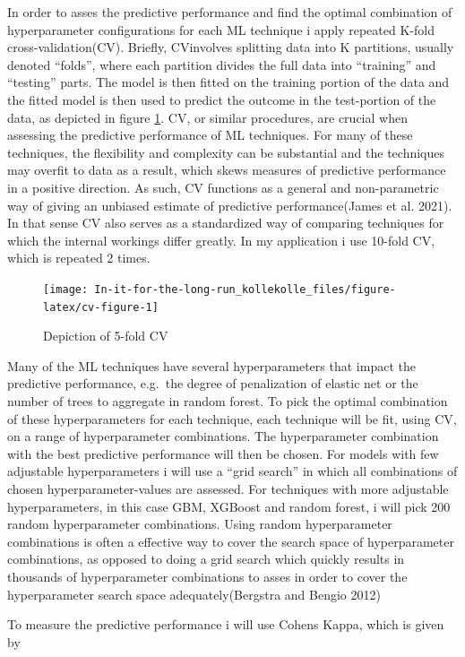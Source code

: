 \documentclass[
]{article}
\begin{document}
In order to asses the predictive performance and find the optimal combination of hyperparameter configurations for each ML technique i apply repeated K-fold cross-validation(CV). Briefly, CVinvolves splitting data into K partitions, usually denoted ``folds'', where each partition divides the full data into ``training'' and ``testing'' parts. The model is then fitted on the training portion of the data and the fitted model is then used to predict the outcome in the test-portion of the data, as depicted in figure \ref{fig:cv-figure}. CV, or similar procedures, are crucial when assessing the predictive performance of ML techniques. For many of these techniques, the flexibility and complexity can be substantial and the techniques may overfit to data as a result, which skews measures of predictive performance in a positive direction. As such, CV functions as a general and non-parametric way of giving an unbiased estimate of predictive performance(James et al. 2021). In that sense CV also serves as a standardized way of comparing techniques for which the internal workings differ greatly. In my application i use 10-fold CV, which is repeated 2 times.

\begin{figure}[H]
\texttt{[image: In-it-for-the-long-run\_kollekolle\_files/figure-latex/cv-figure-1]} \caption{Depiction of 5-fold CV}\label{fig:cv-figure}
\end{figure}

Many of the ML techniques have several hyperparameters that impact the predictive performance, e.g.~the degree of penalization of elastic net or the number of trees to aggregate in random forest. To pick the optimal combination of these hyperparameters for each technique, each technique will be fit, using CV, on a range of hyperparameter combinations. The hyperparameter combination with the best predictive performance will then be chosen. For models with few adjustable hyperparameters i will use a ``grid search'' in which all combinations of chosen hyperparameter-values are assessed. For techniques with more adjustable hyperparameters, in this case GBM, XGBoost and random forest, i will pick 200 random hyperparameter combinations. Using random hyperparameter combinations is often a effective way to cover the search space of hyperparameter combinations, as opposed to doing a grid search which quickly results in thousands of hyperparameter combinations to asses in order to cover the hyperparameter search space adequately(Bergstra and Bengio 2012)

To measure the predictive performance i will use Cohens Kappa, which is given by
\end{document}
